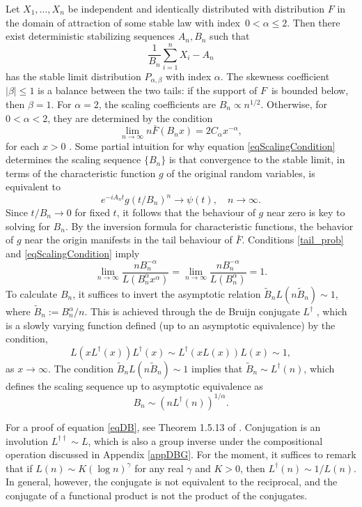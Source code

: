 \documentclass[11pt]{article}
\theoremstyle{definition}
\begin{document}
Let $X_1,\ldots, X_n$ be independent and identically distributed with distribution $F$
in the domain of attraction of some stable law with index~$0 < \alpha \le 2$.
Then there exist deterministic stabilizing sequences $A_n, B_n$ such that
\[
\frac 1 {B_n} \sum_{i=1}^n  X_i - A_n
\]
has the stable limit distribution $P_{\alpha,\beta}$ with index $\alpha$.
The skewness coefficient $|\beta| \le 1$ is a balance between the two tails:
if the support of $F$~is bounded below, then $\beta = 1$.
For $\alpha = 2$, the scaling coefficients are $B_n \propto n^{1/2}$.
Otherwise, for $0 < \alpha < 2$, they are determined by the condition
%
\begin{equation}\label{eqScalingCondition}
\lim_{n \to \infty} n \bar F(B_n x) = 2C_\alpha x^{-\alpha},
\end{equation}
%
for each $x > 0$ \citep[][section~35]{GK1954}. Some partial intuition for why equation \eqref{eqScalingCondition} determines the scaling sequence $\{B_n\}$ is that convergence to the stable limit, in terms of the characteristic function $g$ of the original random variables, is equivalent to
\[
e^{-iA_n t} g(t/B_n)^n \rightarrow \psi(t), \quad n\rightarrow \infty.
\]
Since $t/B_n \to 0$ for fixed $t$, it follows that the behaviour of $g$ near zero is key to solving for $B_n$. By the inversion formula for characteristic functions, the behavior of $g$ near the origin manifests in the tail behaviour of $\bar F$. Conditions \eqref{tail_prob} and \eqref{eqScalingCondition} imply
\[
\lim_{n \to \infty} \frac{n B_n^{-\alpha}} {L(B_n^\alpha x^\alpha)} = \lim_{n \to \infty} \frac{n B_n^{-\alpha}} {L(B_n^\alpha)} = 1.
\]
To calculate $B_n$, it suffices to invert the asymptotic relation $\tilde{B}_n L (n\tilde{B}_n) \sim 1$, where $\tilde{B}_n:=B_n^\alpha/n$.
This is achieved through the de Bruijn conjugate $L^\dagger$ \citep{deBruijn}, which is a slowly varying function defined (up to an asymptotic equivalence) by the condition,
%
\begin{equation}\label{eqDB}
L(x L^\dagger(x)) L^\dagger(x) \sim L^\dagger(x L(x)) L(x) \sim 1,
\end{equation}
as $x \to \infty$.
The condition $\tilde{B}_n L (n\tilde{B}_n)\sim 1$ implies that $\tilde B_n \sim L^\dagger(n)$, which defines the scaling sequence up to asymptotic equivalence as
%
\begin{equation}\label{Bn_sequence}
B_n \sim (n L^\dagger(n))^{1/\alpha}.
\end{equation}


For a proof of equation \eqref{eqDB}, see Theorem 1.5.13 of \citet{Bingham}. Conjugation is an involution $L^{\dagger\dagger} \sim L$, which is also a group inverse under the compositional operation discussed in Appendix \ref{appDBG}. For the moment, it suffices to remark that if $L(n) \sim K (\log n)^\gamma$ for any real $\gamma$ and $K > 0$, then  $L^\dagger(n) \sim 1/L(n)$. In general, however, the conjugate is not equivalent to the reciprocal, and the conjugate of a functional product is not the product of the conjugates.
\end{document}
